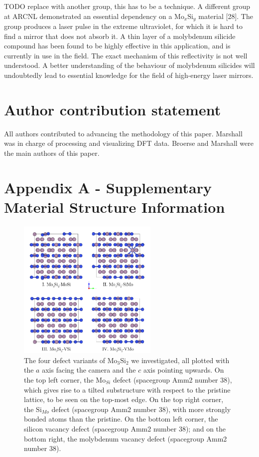 \documentclass[12pt]{article}
\theoremstyle{plain}
\theoremstyle{definition}
\newcommand{\<}{\langle}
\renewcommand{\>}{\rangle}
\begin{document}
TODO replace with another group, this has to be a technique.
A different group at ARCNL demonstrated an essential dependency on a $\text{Mo}_{x}\text{Si}_{y}$ material [28]. The group produces a laser pulse in the extreme ultraviolet, for which it is hard to find a mirror that does not absorb it. A thin layer of a molybdenum silicide compound has been found to be highly effective in this application, and is currently in use in the field. The exact mechanism of this reflectivity is not well understood. A better understanding of the behaviour of molybdenum silicides will undoubtedly lead to essential knowledge for the field of high-energy laser mirrors.



\section{Author contribution statement}
All authors contributed to advancing the methodology of this paper. Marshall was in charge of processing and visualizing DFT data. Broerse and Marshall were the main authors of this paper. 


\medskip

\cleardoublepage

\printbibliography

\cleardoublepage

\pagebreak

\section{Appendix A - Supplementary Material Structure Information}

\begin{figure}
\label{fig:mo3si2-defects-a}
\centering
\includegraphics[width=0.6\textwidth]{img/Mo3Si2-defects-a}
\caption{The four defect variants of $\text{Mo}_3\text{Si}_2$ we investigated, all plotted with the $a$ axis facing the camera and the $c$ axis pointing upwards. On the top left corner, the $\text{Mo}_{Si}$ defect (spacegroup Amm2 number 38), which gives rise to a tilted substructure with respect to the pristine lattice, to be seen on the top-most edge. On the top right corner, the $\text{Si}_{Mo}$ defect (spacegroup Amm2 number 38), with more strongly bonded atoms than the pristine. On the bottom left corner, the silicon vacancy defect (spacegroup Amm2 number 38); and on the bottom right, the molybdenum vacancy defect (spacegroup Amm2 number 38).}
\end{figure}
\end{document}

